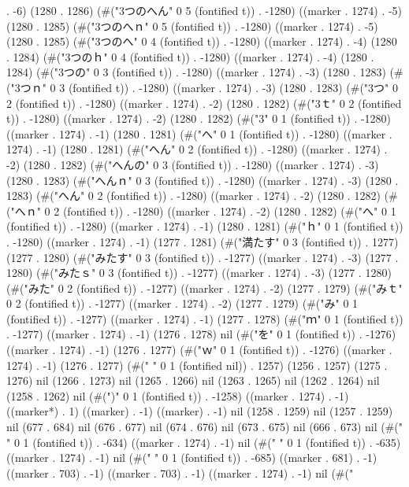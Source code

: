 . -6) (1280 . 1286) (#("3つのへん" 0 5 (fontified t)) . -1280) ((marker . 1274) . -5) (1280 . 1285) (#("3つのへｎ" 0 5 (fontified t)) . -1280) ((marker . 1274) . -5) (1280 . 1285) (#("3つのへ" 0 4 (fontified t)) . -1280) ((marker . 1274) . -4) (1280 . 1284) (#("3つのｈ" 0 4 (fontified t)) . -1280) ((marker . 1274) . -4) (1280 . 1284) (#("3つの" 0 3 (fontified t)) . -1280) ((marker . 1274) . -3) (1280 . 1283) (#("3つｎ" 0 3 (fontified t)) . -1280) ((marker . 1274) . -3) (1280 . 1283) (#("3つ" 0 2 (fontified t)) . -1280) ((marker . 1274) . -2) (1280 . 1282) (#("3ｔ" 0 2 (fontified t)) . -1280) ((marker . 1274) . -2) (1280 . 1282) (#("3" 0 1 (fontified t)) . -1280) ((marker . 1274) . -1) (1280 . 1281) (#("へ" 0 1 (fontified t)) . -1280) ((marker . 1274) . -1) (1280 . 1281) (#("へん" 0 2 (fontified t)) . -1280) ((marker . 1274) . -2) (1280 . 1282) (#("へんの" 0 3 (fontified t)) . -1280) ((marker . 1274) . -3) (1280 . 1283) (#("へんｎ" 0 3 (fontified t)) . -1280) ((marker . 1274) . -3) (1280 . 1283) (#("へん" 0 2 (fontified t)) . -1280) ((marker . 1274) . -2) (1280 . 1282) (#("へｎ" 0 2 (fontified t)) . -1280) ((marker . 1274) . -2) (1280 . 1282) (#("へ" 0 1 (fontified t)) . -1280) ((marker . 1274) . -1) (1280 . 1281) (#("ｈ" 0 1 (fontified t)) . -1280) ((marker . 1274) . -1) (1277 . 1281) (#("満たす" 0 3 (fontified t)) . 1277) (1277 . 1280) (#("みたす" 0 3 (fontified t)) . -1277) ((marker . 1274) . -3) (1277 . 1280) (#("みたｓ" 0 3 (fontified t)) . -1277) ((marker . 1274) . -3) (1277 . 1280) (#("みた" 0 2 (fontified t)) . -1277) ((marker . 1274) . -2) (1277 . 1279) (#("みｔ" 0 2 (fontified t)) . -1277) ((marker . 1274) . -2) (1277 . 1279) (#("み" 0 1 (fontified t)) . -1277) ((marker . 1274) . -1) (1277 . 1278) (#("ｍ" 0 1 (fontified t)) . -1277) ((marker . 1274) . -1) (1276 . 1278) nil (#("を" 0 1 (fontified t)) . -1276) ((marker . 1274) . -1) (1276 . 1277) (#("ｗ" 0 1 (fontified t)) . -1276) ((marker . 1274) . -1) (1276 . 1277) (#(" " 0 1 (fontified nil)) . 1257) (1256 . 1257) (1275 . 1276) nil (1266 . 1273) nil (1265 . 1266) nil (1263 . 1265) nil (1262 . 1264) nil (1258 . 1262) nil (#(")" 0 1 (fontified t)) . -1258) ((marker . 1274) . -1) ((marker*) . 1) ((marker) . -1) ((marker) . -1) nil (1258 . 1259) nil (1257 . 1259) nil (677 . 684) nil (676 . 677) nil (674 . 676) nil (673 . 675) nil (666 . 673) nil (#("	" 0 1 (fontified t)) . -634) ((marker . 1274) . -1) nil (#(" " 0 1 (fontified t)) . -635) ((marker . 1274) . -1) nil (#("
" 0 1 (fontified t)) . -685) ((marker . 681) . -1) ((marker . 703) . -1) ((marker . 703) . -1) ((marker . 1274) . -1) nil (#("
